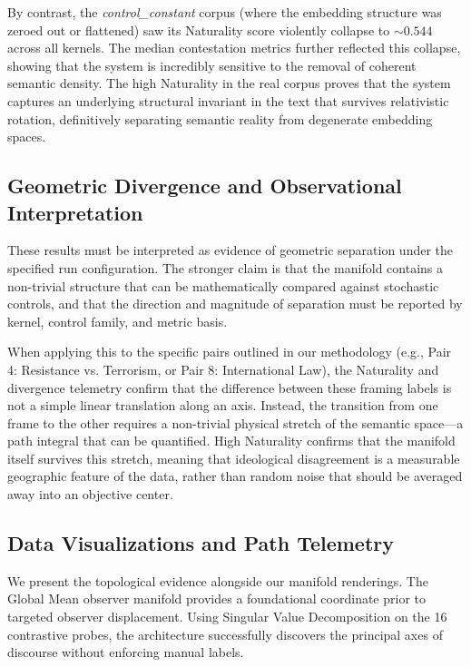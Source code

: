 By contrast, the \emph{control\_constant} corpus (where the embedding structure was zeroed out or flattened) saw its Naturality score violently collapse to $\sim 0.544$ across all kernels. The median contestation metrics further reflected this collapse, showing that the system is incredibly sensitive to the removal of coherent semantic density. The high Naturality in the real corpus proves that the system captures an underlying structural invariant in the text that survives relativistic rotation, definitively separating semantic reality from degenerate embedding spaces.

\subsection{Geometric Divergence and Observational Interpretation}

These results must be interpreted as evidence of geometric separation under the specified run configuration. The stronger claim is that the manifold contains a non-trivial structure that can be mathematically compared against stochastic controls, and that the direction and magnitude of separation must be reported by kernel, control family, and metric basis. 

When applying this to the specific pairs outlined in our methodology (e.g., Pair 4: Resistance vs. Terrorism, or Pair 8: International Law), the Naturality and divergence telemetry confirm that the difference between these framing labels is not a simple linear translation along an axis. Instead, the transition from one frame to the other requires a non-trivial physical stretch of the semantic space---a path integral that can be quantified. High Naturality confirms that the manifold itself survives this stretch, meaning that ideological disagreement is a measurable geographic feature of the data, rather than random noise that should be averaged away into an objective center.

\subsection{Data Visualizations and Path Telemetry}

We present the topological evidence alongside our manifold renderings. The Global Mean observer manifold provides a foundational coordinate prior to targeted observer displacement. Using Singular Value Decomposition on the 16 contrastive probes, the architecture successfully discovers the principal axes of discourse without enforcing manual labels. 

